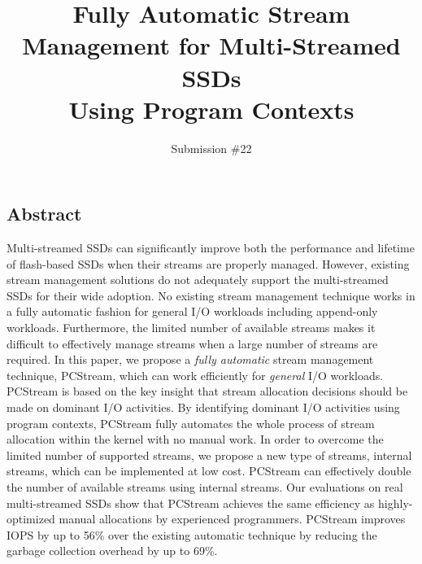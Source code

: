 \documentclass[letterpaper, twocolumn, 10pt]{article}
\begin{document}
\title{
\bf Fully Automatic Stream Management for Multi-Streamed SSDs \\ Using Program Contexts}


\author{
{\rm Submission \#22} \\
}



%


\maketitle
\subsection*{Abstract}
\vspace{-6pt}
Multi-streamed SSDs can significantly improve both the performance and lifetime
of flash-based SSDs when their streams are properly managed.  However, existing
stream management solutions do not adequately support the multi-streamed SSDs
for their wide adoption.  No existing stream management technique works in a
fully automatic fashion for general I/O workloads including append-only
workloads.  Furthermore, the limited number of available streams makes it
difficult to effectively manage streams when a large number of streams are
required.  In this paper, we propose a {\it fully automatic} stream management
technique, \textsf{\small PCStream}, which can work efficiently for {\it
general} I/O workloads.  \textsf{\small PCStream} is based on the key insight
that stream allocation decisions should be made on dominant I/O activities. By
identifying dominant I/O activities using program contexts, \textsf{\small
PCStream} fully automates the whole process of stream allocation within the
kernel with no manual work.  In order to overcome the limited number of
supported streams, we propose a new type of streams, internal streams, which
can be implemented at low cost.  \textsf{\small PCStream} can effectively
double the number of available streams using internal streams.  Our evaluations
on real multi-streamed SSDs show that \textsf{\small PCStream} achieves the
same efficiency as highly-optimized manual allocations by experienced
programmers.  \textsf{\small PCStream} improves IOPS by up to 56\% over the
existing automatic technique by reducing the garbage collection overhead by up
to 69\%.
\end{document}
